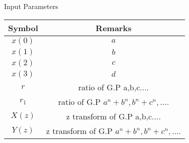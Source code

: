 \setlength{\arrayrulewidth}{0.3mm}
\setlength{\tabcolsep}{12pt}
\renewcommand{\arraystretch}{1.5}


\begin{center}
\caption{Input Parameters}
\begin{tabular}{|c|c|}

\hline
 {Symbol}&{Remarks}\\
\hline
$x(0) $ & $a$ \\
\hline
$x(1) $ & $b$ \\
\hline
$x(2) $ & $c$ \\
\hline
$x(3) $ & $d$ \\
\hline
$r$ & ratio of G.P a,b,c....\\
\hline
$r_1$ & ratio of G.P $a^n + b^n,b^n + c^n,....$\\
\hline
$X(z)$ & z transform of G.P a,b,c....\\
\hline
$Y(z)$ & z transform of G.P $a^n + b^n,b^n + c^n,....$\\
\hline

\end{tabular}
\end{center}
